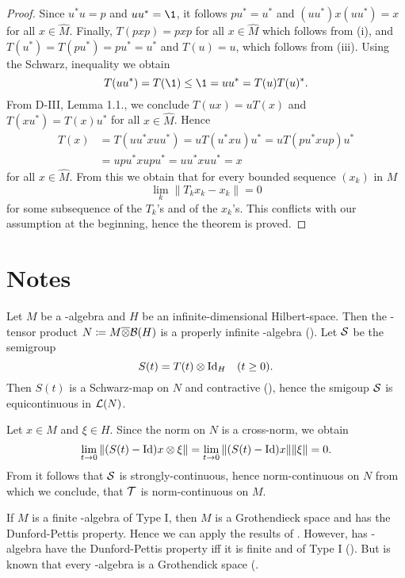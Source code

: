 \begin{proof}
Since $u^{*}u = p$ and $uu^{*} = \1$, it follows $pu^{*} = u^{*}$ and $(uu^{*})x(uu^{*}) = x$ for all $x \in \widehat{M}$.
Finally, $T(pxp) = pxp$ for all $x \in \widehat{M}$ which follows from (i), and $T(u^{*}) = T(pu^{*}) = pu^{*} = u^{*}$ and $T(u) = u$, which follows from (iii).
Using the Schwarz, inequality we obtain
\[
	T(uu^{*}) = T(\1) \leq \1 = uu^{*} = T(u)T(u)^{*}.
\]
From D-III, Lemma 1.1., we conclude $T(ux) = uT(x)$ and $T(xu^{*}) = T(x)u^{*}$ for all $x \in \widehat{M}$.
Hence
\begin{align*}
T(x) &= T(uu^{*}xuu^{*}) = uT(u^{*}xu)u^{*} = uT(pu^{*}xup)u^{*} \\
&= upu^{*}xupu^{*} = uu^{*}xuu^{*} = x
\end{align*}
for all $x \in \widehat{M}$.
From this we obtain that for every bounded sequence $(x_{k})$ in $M$
\[
	\lim_k \|T_k x_{k} - x_{k}\| = 0
\]
for some subsequence of the $T_{k}$'s and of the $x_{k}$'s.
This conflicts with our assumption at the beginning, hence the theorem is proved.
\end{proof}

\section*{Notes}
Let $ M $ be a \WA-algebra and $ H $ be an infinite-dimensional Hilbert-space. 
Then the \WA-tensor product $ N \coloneq M \overline{\otimes} \mathcal{B}(H) $ is a properly infinite \WA-algebra (\citet[Thm. 2.6.6]{sakai:1971}).
Let $ \mathcal{S} $ be the semigroup 
%
\[
	S(t) = T(t) \otimes \operatorname{Id}_{H} \quad (t \geq 0). 
\]
%
Then $ S(t) $ is a Schwarz-map on $ N $ and contractive (\citet[Prop. IV.5.13.]{takesaki:1979}), hence the smigoup $ \mathcal{S} $ is equicontinuous in $ \mathcal{L}(N) $.

Let $ x \in M $ and $  \xi \in H$.
Since the norm on $ N $ is a cross-norm, we obtain
%
\[
	\lim_{t \to 0} \| ( S(t) - \operatorname{Id} ) x \otimes \xi \| =
	\lim_{t \to 0} \| ( S(t) - \operatorname{Id} ) x \| \| \xi \| = 0.
\]
%
From \citet[III.4.5]{schaefer:1966} it follows that $ \mathcal{S} $ is strongly-continuous, hence norm-continuous on $ N $ from which we conclude, that $ \mathcal{T} $ is norm-continuous on $ M $.
\begin{remark}
If $ M $ is a finite \WA-algebra of Type I, then $ M $ is a Grothendieck space and has the Dunford-Pettis property. 
Hence we can apply the results of \citet{lotz:1985}.
However, has \WA-algebra have the Dunford-Pettis property iff it is finite and of Type I (\citet{chu:1990}).
But is known that every \WA-algebra is a Grothendick space (\citet{pfitzner:1994}.
\end{remark}


\RaggedRight

